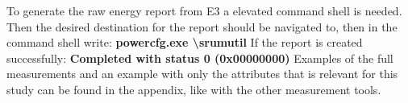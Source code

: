To generate the raw energy report from E3 a elevated command shell is needed. Then the desired destination for the report should be navigated to, then in the command shell write:
\newline
\textbf{powercfg.exe \textbackslash srumutil}
\newline
If the report is created successfully:
\newline
\textbf{Completed with status 0 (0x00000000)}
Examples of the full measurements and an example with only the attributes that is relevant for this study can be found in the appendix, like with the other measurement tools. 



